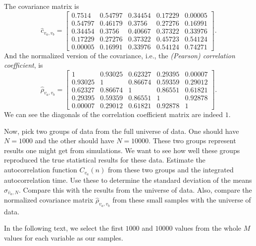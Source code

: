 \Answer{}
The covariance matrix is
%
\begin{equation}
    \hat{c}_{v_a, v_b} =
    \begin{bmatrix}
        0.7514  & 0.54797 & 0.34454 & 0.17229 & 0.00005 \\
        0.54797 & 0.46179 & 0.3756  & 0.27276 & 0.16991 \\
        0.34454 & 0.3756  & 0.40667 & 0.37322 & 0.33976 \\
        0.17229 & 0.27276 & 0.37322 & 0.45723 & 0.54124 \\
        0.00005 & 0.16991 & 0.33976 & 0.54124 & 0.74271
    \end{bmatrix}.
\end{equation}
%
And the normalized version of the covariance, i.e., the
\emph{(Pearson) correlation coefficient}, is
%
\begin{equation}
    \hat{\rho}_{v_a, v_b} =
    \begin{bmatrix}
        1       & 0.93025 & 0.62327 & 0.29395 & 0.00007 \\
        0.93025 & 1       & 0.86674 & 0.59359 & 0.29012 \\
        0.62327 & 0.86674 & 1       & 0.86551 & 0.61821 \\
        0.29395 & 0.59359 & 0.86551 & 1       & 0.92878 \\
        0.00007 & 0.29012 & 0.61821 & 0.92878 & 1
    \end{bmatrix}.
\end{equation}
%
We can see the diagonals of the correlation coefficient matrix are indeed \(1\).


\Question{} Now, pick two groups of data from the full universe of data. One should have
\(N = 1000\) and the other should have \(N = 10000\). These two groups represent results one
might get from simulations. We want to see how well these groups reproduced the true
statistical results for these data.
Estimate the autocorrelation function \(C_{v_a}(n)\) from these two groups and the integrated
autocorrelation time. Use these to determine the standard deviation of the means
\(\sigma_{\bar{v}_a,N}\). Compare this with the results from the universe of data. Also,
compare the normalized covariance matrix \(\hat{\rho}_{v_a, v_b}\) from these small samples
with the universe of data.

\Answer{}
In the following text, we select the first \(1000\) and \(10000\) values from the whole
\(M\) values for each variable as our samples.

